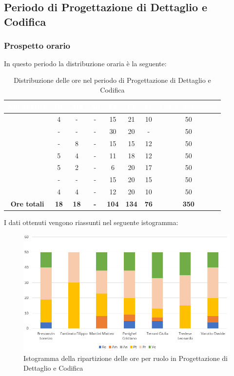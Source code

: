 \subsection{Periodo di Progettazione di Dettaglio e Codifica}
\subsubsection{Prospetto orario}
In questo periodo la distribuzione oraria è la seguente:
\begin{table}[H]
	\begin{center}
		\begin{tabular}{ |c c c c c c c c| }
		\rowcolor{darkblue} 
		\textcolor{white}{\textbf{Nominativo}} & \textcolor{white}{\textbf{Re}} & \textcolor{white}{\textbf{Am}} & \textcolor{white}{\textbf{An}} & \textcolor{white}{\textbf{Pt}} & \textcolor{white}{\textbf{Pr}} & \textcolor{white}{\textbf{Ve}} & \textcolor{white}{\textbf{Ore Complessive}} \\ \hline
		\BL 	& 4  	& -  	& - 	& 15 	& 21 	& 10 	& 50 \\ \hline
		\FF 	& -  	& -  	& - 	& 30 	& 20 	& -  	& 50 \\ \hline
		\MM 	& -  	& 8  	& - 	& 15 	& 15 	& 12 	& 50 \\ \hline
		\PC 	& 5 	& 4  	& - 	& 11 	& 18 	& 12 	& 50 \\ \hline
		\TG 	& 5  	& 2		& - 	& 6 	& 20 	& 17 	& 50 \\ \hline
		\TL 	& -  	& - 	& - 	& 15 	& 20 	& 15 	& 50 \\ \hline
		\VD 	& 4  	& 4  	& - 	& 12 	& 20 	& 10 	& 50 \\ \hline
		\textbf{Ore totali} & \textbf{18} & \textbf{18} & \textbf{-} & \textbf{104} & \textbf{134} & \textbf{76} & \textbf{350} \\ \hline
		\end{tabular}
	\caption{Distribuzione delle ore nel periodo di Progettazione di Dettaglio e Codifica}
	\end{center}
\end{table}
I dati ottenuti vengono riassunti nel seguente istogramma:
\begin{figure}[H]
    \centering
    \includegraphics[scale = 0.70]{Immagini/DettaglioIsto.png}
    \caption{Istogramma della ripartizione delle ore per ruolo in Progettazione di Dettaglio e Codifica}
    \label{fig:istogramma ripartizione ore, periodo di Progettazione di Dettaglio e Codifica}
\end{figure}
\newpage
